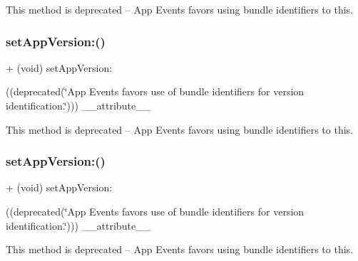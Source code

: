 This method is deprecated -- App Events favors using bundle identifiers to this. \mbox{\label{interfaceFBSettings_a01b8ded28d0bc4e050ff6eccb9a03383}} 
\subsubsection{\texorpdfstring{set\+App\+Version\+:()}{setAppVersion:()}\hspace{0.1cm}{\footnotesize\ttfamily [4/5]}}
{\footnotesize\ttfamily + (void) set\+App\+Version\+: \begin{DoxyParamCaption}\item[{((deprecated(\char`\"{}App Events favors use of bundle identifiers for version identification.\char`\"{})))}]{\+\_\+\+\_\+attribute\+\_\+\+\_\+ }\end{DoxyParamCaption}}

This method is deprecated -- App Events favors using bundle identifiers to this. \mbox{\label{interfaceFBSettings_a01b8ded28d0bc4e050ff6eccb9a03383}} 
\subsubsection{\texorpdfstring{set\+App\+Version\+:()}{setAppVersion:()}\hspace{0.1cm}{\footnotesize\ttfamily [5/5]}}
{\footnotesize\ttfamily + (void) set\+App\+Version\+: \begin{DoxyParamCaption}\item[{((deprecated(\char`\"{}App Events favors use of bundle identifiers for version identification.\char`\"{})))}]{\+\_\+\+\_\+attribute\+\_\+\+\_\+ }\end{DoxyParamCaption}}

This method is deprecated -- App Events favors using bundle identifiers to this. \mbox{\label{interfaceFBSettings_a07cfc161668c190bf5fd37934821c4de}} 
